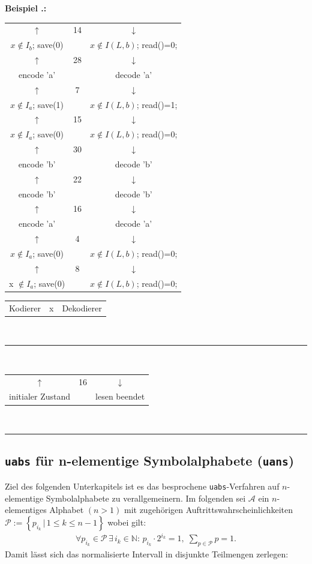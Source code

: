 \documentclass[a4paper,12pt]{article}
\newcommand{\N}{\mathbb N}
\newcommand{\A}{\mathcal A}
\newcommand{\xP}{\mathcal P}
\newcounter{Beispiel}
\newenvironment{Beispiel}{
\medskip
        
        \setlength{\parindent}{0pt}
        \addtocounter{Beispiel}{1}
        \textbf{\textsf{Beispiel \thesubsection.\theBeispiel}:}\\}{
        \nopagebreak
        \vspace{-1.0ex}
        \bigskip
        
}
\begin{document}
\begin{Beispiel}
\begin{center}
\begin{tabular}{c c c}
$\uparrow$ & 14 & $\downarrow$
\\
$x \not\in I_{b}$; save(0) &  &$x\not\in I(L,b)$; read()=0;
\\
$\uparrow$ & 28 & $\downarrow$
\\
encode 'a' & & decode 'a'
\\
$\uparrow$ & 7 & $\downarrow$
\\
$x \not\in I_{a}$; save(1) &  &$x\not\in I(L,b)$; read()=1;
\\
$\uparrow$ & 15 & $\downarrow$
\\
$x \not\in I_{a}$; save(0) &  &$x\not\in I(L,b)$; read()=0;
\\
$\uparrow$ & 30 & $\downarrow$
\\
encode 'b' & & decode 'b'
\\
$\uparrow$ & 22 & $\downarrow$
\\
encode 'b' & & decode 'b'
\\
$\uparrow$ & 16 & $\downarrow$
\\
encode 'a' & & decode 'a'
\\
$\uparrow$ & 4 & $\downarrow$
\\
$x \not\in I_{a}$; save(0) &  & $x\not\in I(L,b)$; read()=0;
\\
$\uparrow$ & 8 & $\downarrow$
\\
x $\not\in I_{a}$; save(0) &  & $x\not\in I(L,b)$; read()=0;
\end{tabular}
\end{center}
\begin{center}
\begin{tabular}{c c c}
Kodierer & x & Dekodierer
\end{tabular}
\vspace{-0.2cm}
\\
{\color{gray!50!blue}\rule{8cm}{0.1mm}}
\\
\begin{tabular}{c c c}
$\uparrow$ & 16  & $\downarrow$
\\
initialer Zustand & & lesen beendet
\end{tabular}
\\
{\color{gray!50!red}\rule{8cm}{0.1mm}}
\end{center}
\end{Beispiel}
\subsection{{\tt{uabs}} für n-elementige Symbolalphabete ({\tt{uans}})}
Ziel des folgenden Unterkapitels ist es das besprochene {\tt{uabs}}-Verfahren auf $n$-elementige Symbolalphabete zu verallgemeinern.
Im folgenden sei $\A$ ein $n$-elementiges Alphabet $(n > 1)$ mit zugehörigen Auftrittswahrscheinlichkeiten $\xP:=\left\{p_{i_{k}}\,|\,1\leq k \leq n-1\right\}$ wobei gilt:
\begin{align*}
\forall p_{i_{k}} \in \xP\, \exists\, i_{k}\in\N :\, p_{i_{k}}\cdot 2^{i_{k}} =1,\; \sum_{p\in\xP}p = 1.
\end{align*}
Damit lässt sich das  normalisierte Intervall in disjunkte Teilmengen zerlegen:
\end{document}
